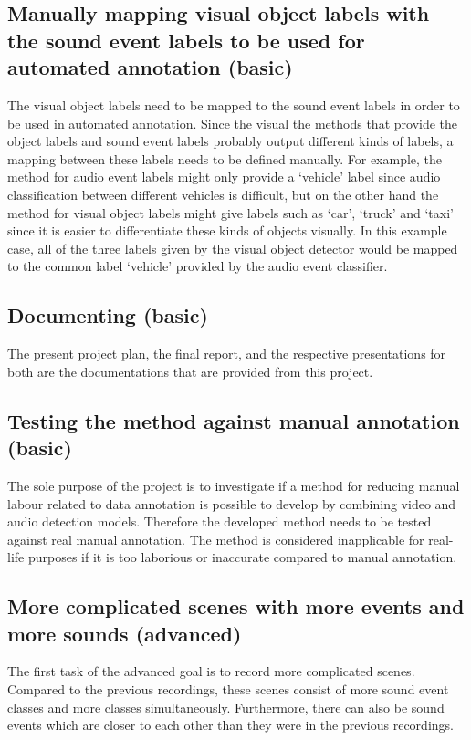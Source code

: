 \subsection{Manually mapping visual object labels with the sound event labels to be used for automated annotation (basic)}

The visual object labels need to be mapped to the sound event labels in order to be used in automated annotation.
Since the visual the methods that provide the object labels and sound event labels probably output different
kinds of labels, a mapping between these labels needs to be defined manually. For example, the method for audio
event labels might only provide a `vehicle' label since audio classification between different vehicles is 
difficult, but on the other hand the method for visual object labels might give labels such as `car', `truck' and
`taxi' since it is easier to differentiate these kinds of objects visually. In this example case, all of the 
three labels given by the visual object detector would be mapped to the common label `vehicle' provided by the
audio event classifier.

\subsection{Documenting (basic)}

The present project plan, the final report, and the respective presentations for both are the documentations
that are provided from this project.

\subsection{Testing the method against manual annotation (basic)}

The sole purpose of the project is to investigate if a method for reducing manual labour related to data annotation is possible to develop by combining video and audio detection models. Therefore the developed method needs to be tested against real manual annotation. The method is considered
inapplicable for real-life purposes if it is too laborious or inaccurate compared to manual
annotation.

\subsection{More complicated scenes with more events and more sounds (advanced)}

The first task of the advanced goal is to record more complicated scenes. Compared to the previous recordings, 
these scenes consist of more sound event classes and more classes simultaneously. Furthermore, there can also be
sound events which are closer to each other than they were in the previous recordings.

